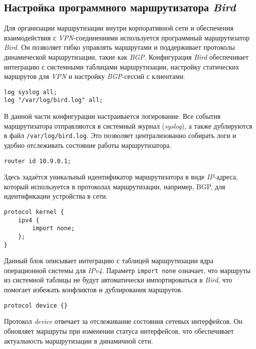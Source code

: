 \subsection[ Настройка программного маршрутизатора \textit{Bird}]{Настройка программного маршрутизатора \textit{Bird}}

Для организации маршрутизации внутри корпоративной сети и обеспечения взаимодействия с \textit{VPN}-соединениями используется программный маршрутизатор \textit{Bird}. Он позволяет гибко управлять маршрутами и поддерживает протоколы динамической маршрутизации, такие как \textit{BGP}. Конфигурация \textit{Bird} обеспечивает интеграцию с системными таблицами маршрутизации, настройку статических маршрутов для \textit{VPN} и настройку \textit{BGP}-сессий с клиентами.

\begin{lstlisting}
log syslog all;
log "/var/log/bird.log" all;
\end{lstlisting}

В данной части конфигурации настраивается логирование. Все события маршрутизатора отправляются в системный журнал (\textit{syslog}), а также дублируются в файл \lstinline{/var/log/bird.log}. Это позволяет централизованно собирать логи и удобно отслеживать состояние работы маршрутизатора.

\begin{lstlisting}
router id 10.9.0.1;
\end{lstlisting}

Здесь задаётся уникальный идентификатор маршрутизатора в виде \textit{IP}-адреса, который используется в протоколах маршрутизации, например, BGP, для идентификации устройства в сети.

\begin{lstlisting}
protocol kernel {
    ipv4 {
        import none;
    };
}
\end{lstlisting}

Данный блок описывает интеграцию с таблицей маршрутизации ядра операционной системы для \textit{IPv4}. Параметр \lstinline{import none} означает, что маршруты из системной таблицы не будут автоматически импортироваться в \textit{Bird}, что помогает избежать конфликтов и дублирования маршрутов.

\begin{lstlisting}
protocol device {}
\end{lstlisting}

Протокол \textit{device} отвечает за отслеживание состояния сетевых интерфейсов. Он обновляет маршруты при изменении статуса интерфейсов, что обеспечивает актуальность маршрутизации в динамичной сети.

